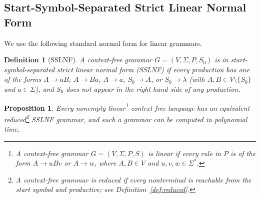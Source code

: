 \documentclass[11pt,a4paper]{article}
\newtheorem{proposition}[theorem]{Proposition}
\newtheorem{definition}[theorem]{Definition}
\begin{document}
\subsection{Start-Symbol-Separated Strict Linear Normal Form}
\label{subsec:sslnf}

We use the following standard normal form for linear grammars.

\begin{definition}[SSLNF]
\label{def:sslnf}
A context-free grammar $G=(V,\Sigma,P,S_0)$ is in
\emph{start-symbol-separated strict linear normal form} (SSLNF) if every production
has one of the forms $A\to aB$, $A\to Ba$, $A\to a$, $S_0\to A$, or $S_0\to\lambda$
(with $A,B\in V\setminus\{S_0\}$ and $a\in\Sigma$), and $S_0$ does not appear
in the right-hand side of any production.
\end{definition}

\begin{proposition}
\label{prop:sslnf}
Every nonempty linear\footnote{A context-free grammar $G=(V,\Sigma,P,S)$ is \emph{linear} if every rule in $P$ is of the form $A\to uBv$ or $A\to w$, where $A,B\in V$ and $u,v,w\in\Sigma^*$.} context-free language has an equivalent reduced\footnote{A context-free grammar is \emph{reduced} if every nonterminal is reachable from the start symbol and productive; see Definition~\ref{def:reduced}.} SSLNF grammar, and such a grammar can be computed in polynomial time.
\end{proposition}
\end{document}
